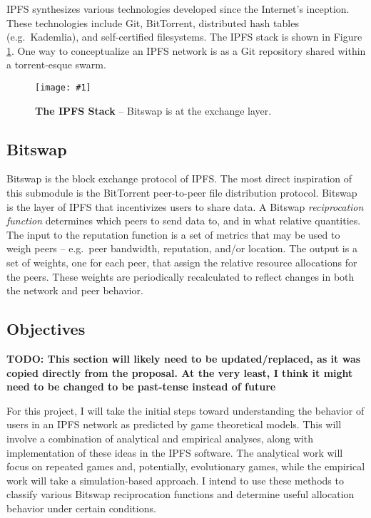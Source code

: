 \documentclass[12pt,letterpaper,]{article}
\newcommand{\graphicwlc}[5]{\begin{figure}\center
    \texttt{[image: \#1]}\caption[#4]{#5}\label{#3}\end{figure}}
\begin{document}
IPFS synthesizes various technologies developed since the Internet's
inception. These technologies include Git, BitTorrent, distributed hash
tables (e.g.~Kademlia), and self-certified filesystems. The IPFS stack
is shown in Figure \ref{img:ipfs-stack}. One way to conceptualize an
IPFS network is as a Git repository shared within a torrent-esque swarm.

\vspace{0.5cm}
\graphicwlc{../figures/ipfs_stack.png}{4in}{img:ipfs-stack}{The IPFS Stack}{{\bf The IPFS Stack}
-- Bitswap is at the exchange layer.}

\hypertarget{bitswap}{%
\subsection{Bitswap}\label{bitswap}}

Bitswap is the block exchange protocol of IPFS. The most direct
inspiration of this submodule is the BitTorrent peer-to-peer file
distribution protocol. Bitswap is the layer of IPFS that incentivizes
users to share data. A Bitswap \emph{reciprocation function} determines
which peers to send data to, and in what relative quantities. The input
to the reputation function is a set of metrics that may be used to weigh
peers -- e.g.~peer bandwidth, reputation, and/or location. The output is
a set of weights, one for each peer, that assign the relative resource
allocations for the peers. These weights are periodically recalculated
to reflect changes in both the network and peer behavior.

\hypertarget{objectives}{%
\subsection{Objectives}\label{objectives}}

\textbf{TODO: This section will likely need to be updated/replaced, as
it was copied directly from the proposal. At the very least, I think it
might need to be changed to be past-tense instead of future}

For this project, I will take the initial steps toward understanding the
behavior of users in an IPFS network as predicted by game theoretical
models. This will involve a combination of analytical and empirical
analyses, along with implementation of these ideas in the IPFS software.
The analytical work will focus on repeated games and, potentially,
evolutionary games, while the empirical work will take a
simulation-based approach. I intend to use these methods to classify
various Bitswap reciprocation functions and determine useful allocation
behavior under certain conditions.
\end{document}
